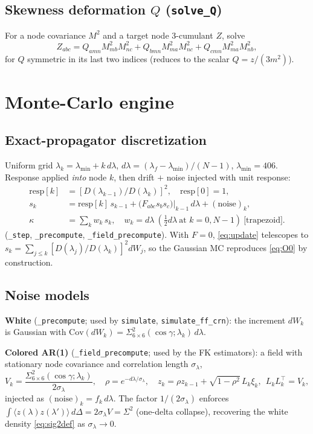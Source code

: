 \documentclass[11pt]{article}
\newcommand{\code}[1]{\texttt{#1}}
\newcommand{\lam}{\lambda}
\newcommand{\lamf}{\lambda_f}
\newcommand{\Sig}{\Sigma^{2}}
\newcommand{\D}{D}
\newcommand{\Cov}{\mathrm{Cov}}
\begin{document}
\subsection{Skewness deformation $Q$ \quad(\code{solve\_Q})}
For a node covariance $M^2$ and a target node 3-cumulant $Z$, solve
\begin{equation}
Z_{abc}=Q_{amn}M^2_{mb}M^2_{nc}+Q_{bmn}M^2_{ma}M^2_{nc}+Q_{cmn}M^2_{ma}M^2_{nb},
\label{eq:solveQ}
\end{equation}
for $Q$ symmetric in its last two indices (reduces to the scalar $Q=z/(3m^2)$).

\section{Monte-Carlo engine \quad{\normalsize(\code{sachs\_mc\_core.py})}}

\subsection{Exact-propagator discretization}
Uniform grid $\lam_k=\lam_{\min}+k\,d\lam$, $d\lam=(\lamf-\lam_{\min})/(N-1)$,
$\lam_{\min}=406$. Response applied \emph{into} node $k$, then drift $+$ noise
injected with unit response:
\begin{align}
\mathrm{resp}[k]&=[\D(\lam_{k-1})/\D(\lam_k)]^2,\quad \mathrm{resp}[0]=1,
\label{eq:resp}\\
s_k&=\mathrm{resp}[k]\,s_{k-1}+\bigl(F_{abc}s_b s_c\bigr)\big|_{k-1}\,d\lam+(\text{noise})_k,
\label{eq:update}\\
\kappa&=\sum_k w_k\,s_k,\quad w_k=d\lam\ (\tfrac12 d\lam\ \text{at }k=0,N{-}1)\ \text{[trapezoid]}.
\label{eq:trap}
\end{align}
(\code{\_step}, \code{\_precompute}, \code{\_field\_precompute}). With $F{=}0$,
\eqref{eq:update} telescopes to $s_k=\sum_{j\le k}[\D(\lam_j)/\D(\lam_k)]^2 dW_j$,
so the Gaussian MC reproduces \eqref{eq:O0} by construction.

\subsection{Noise models}
\textbf{White} (\code{\_precompute}; used by \code{simulate}, \code{simulate\_ff\_crn}):
the increment $dW_k$ is Gaussian with $\Cov(dW_k)=\Sig_{6\times6}(\cos\gamma;\lam_k)\,d\lam$.

\textbf{Colored AR(1)} (\code{\_field\_precompute}; used by the FK estimators): a
field with stationary node covariance and correlation length $\sigma_\lam$,
\begin{equation}
V_k=\frac{\Sig_{6\times6}(\cos\gamma;\lam_k)}{2\sigma_\lam},\quad
\rho=e^{-d\lam/\sigma_\lam},\quad
z_k=\rho z_{k-1}+\sqrt{1-\rho^2}\,L_k\xi_k,\ \ L_kL_k^{\!\top}=V_k,
\label{eq:ar1}
\end{equation}
injected as $(\text{noise})_k=f_k\,d\lam$. The factor $1/(2\sigma_\lam)$ enforces
$\int\langle z(\lam)z(\lam')\rangle\,d\Delta=2\sigma_\lam V=\Sig$ (one-delta
collapse), recovering the white density \eqref{eq:sig2def} as $\sigma_\lam\to0$.
\end{document}
